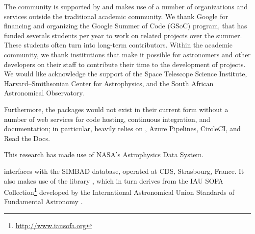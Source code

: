 \documentclass[modern]{aastex631}
\begin{document}
The \astropy community is supported by and makes use of a number of
organizations and services outside the traditional academic community.
We thank Google for financing and organizing the
Google Summer of Code (GSoC) program, that has funded severals
students per year to work on \astropy related projects over the
summer. These students often turn into long-term contributors.
Within the academic community, we thank institutions that make it possible for
astronomers and other developers on their staff to contribute their time to the
development of \astropy projects.
We would like acknowledge the support of the Space Telescope Science Institute,
Harvard--Smithsonian Center for Astrophysics, and the South African Astronomical
Observatory.

Furthermore, the \astropy packages would not exist in their current form without
a number of web services for code hosting, continuous integration, and
documentation; in particular, \astropy heavily relies on \github, Azure
Pipelines, CircleCI, and Read the Docs.

This research has made use of NASA's Astrophysics Data System.

\astropypkg interfaces with the SIMBAD database, operated at CDS, Strasbourg,
France. It also makes use of the  library \citep{erfa}, which in turn
derives from the IAU SOFA Collection\footnote{\url{http://www.iausofa.org}}
developed by the International Astronomical Union Standards of Fundamental
Astronomy \citep{sofa}.






\appendix
\end{document}
